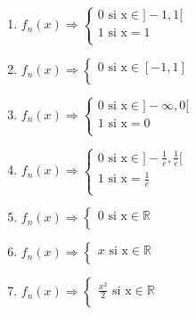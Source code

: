 \documentclass{article}
\begin{document}
\newpage
\begin{enumerate}[label=\alph*)]
    \item $f_n(x) \Rightarrow \left\{
        \begin{array}{ll}
            0 \mbox{ si x} \in ]-1, 1[\\
            1 \mbox{ si x} = 1\\
        \end{array}
    \right.$
    \item $f_n(x) \Rightarrow \left\{
        \begin{array}{ll}
            0 \mbox{ si x} \in [-1, 1]\\
        \end{array}
    \right.$
    \item $f_n(x) \Rightarrow \left\{
        \begin{array}{ll}
            0 \mbox{ si x} \in ]-\infty, 0[\\
            1 \mbox{ si x} = 0\\
        \end{array}
    \right.$
    \item $f_n(x) \Rightarrow \left\{
        \begin{array}{ll}
            0 \mbox{ si x} \in ]-\frac{1}{e}, \frac{1}{e}[\\
            1 \mbox{ si x} = \frac{1}{e}\\
        \end{array}
    \right.$
    \item $f_n(x) \Rightarrow \left\{
        \begin{array}{ll}
            0 \mbox{ si x} \in \mathbb{R}\\
        \end{array}
    \right.$
    \item $f_n(x) \Rightarrow \left\{
        \begin{array}{ll}
            x \mbox{ si x} \in \mathbb{R}\\
        \end{array}
    \right.$
    \item $f_n(x) \Rightarrow \left\{
        \begin{array}{ll}
            \frac{x^2}{2} \mbox{ si x} \in \mathbb{R}\\
        \end{array}
    \right.$
\end{enumerate}
\end{document}

